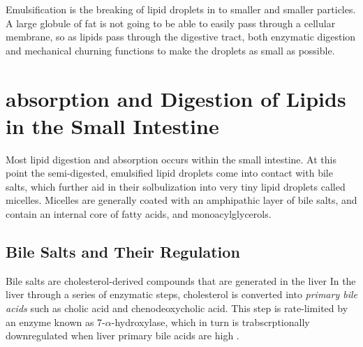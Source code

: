 \documentclass{tufte-handout}
\begin{document}
  Emulsification is the breaking of lipid droplets in to smaller and smaller particles.  A large globule of fat is not going to be able to easily pass through a cellular membrane, so as lipids pass through the digestive tract, both enzymatic digestion and mechanical churning functions to make the droplets as small as possible.

\section{absorption and Digestion of Lipids in the Small Intestine}

Most lipid digestion and absorption occurs within the small intestine.  At this point the semi-digested, emulsified lipid droplets come into contact with bile salts, which further aid in their solbulization into very tiny lipid droplets called micelles.  Micelles are generally coated with an amphipathic layer of bile salts, and contain an internal core of fatty acids, and monoacylglycerols.

\subsection{Bile Salts and Their Regulation}

Bile salts are cholesterol-derived compounds that are generated in the liver  In the liver through a series of enzymatic steps, cholesterol is converted into \emph{primary bile acids} such as cholic acid and chenodeoxycholic acid.  This step is rate-limited by an enzyme known as 7-$\alpha$-hydroxylase, which in turn is trabscrptionally downregulated when liver primary bile acids are high \citep{Ramirez1994}.
\end{document}
